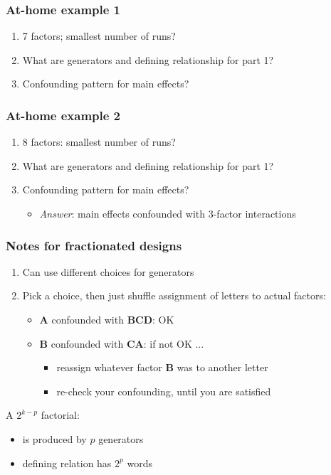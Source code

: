 \begin{frame}\frametitle{At-home example 1}
	\begin{enumerate}
		\item	7 factors; smallest number of runs?
		\item	What are generators and defining relationship for part 1?
		\item	Confounding pattern for main effects?
	\end{enumerate}
\end{frame}

\begin{frame}\frametitle{At-home example 2}
	\begin{enumerate}
		\item	8 factors: smallest number of runs?
		\item	What are generators and defining relationship for part 1?
		\item	Confounding pattern for main effects?
		\begin{itemize}
			\item	\emph{Answer}: main effects confounded with 3-factor interactions
		\end{itemize}
	\end{enumerate}
\end{frame}

\begin{frame}\frametitle{Notes for fractionated designs}
	\begin{enumerate}
		\item	Can use different choices for generators
		\item	Pick a choice, then just shuffle assignment of letters to actual factors:
		\begin{itemize}
			\item	\textbf{A} confounded with \textbf{BCD}: OK
			\item	\textbf{B} confounded with \textbf{CA}: if not OK ...
			\begin{itemize}
				\item	reassign whatever factor \textbf{B} was to another letter
				\item	re-check your confounding, until you are satisfied
			\end{itemize}
		\end{itemize}
	\end{enumerate}

	A $2^{k-p}$ factorial:
	\begin{itemize}
		\item	is produced by $p$ generators
		\item	defining relation has $2^p$ words
	\end{itemize}
\end{frame}

